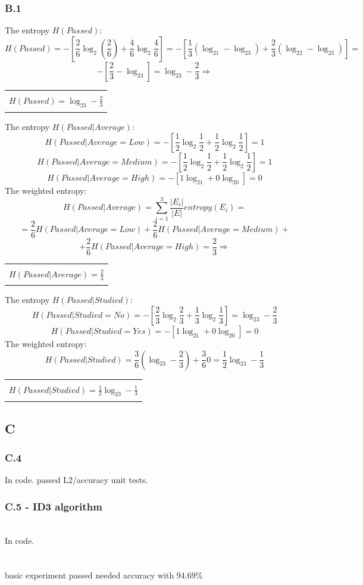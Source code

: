 \documentclass[12pt]{article}
\newcommand{\rectres}[1]{
\begin{center}
\begin{tabular}{ |c| }
\hline\\
#1\\
\\
\hline
\end{tabular}
\end{center}
}
\begin{document}
\subsubsection*{B.1}
The entropy $H(Passed)$:
$$H(Passed)= -[\frac{2}{6}\log_2(\frac{2}{6}) + \frac{4}{6}\log_2\frac{4}{6}] = -[\frac{1}{3}(\log_21- \log_23) + \frac{2}{3}(\log_22 - \log_23)]=$$ 
$$-[\frac{2}{3} - \log_23] = \log_23 - \frac{2}{3} \Rightarrow$$
\rectres{$H(Passed)=\log_23 - \frac{2}{3}$}
The entropy $H(Passed|Average)$:
$$H(Passed|Average=Low)= -[\frac{1}{2}\log_2\frac{1}{2} +\frac{1}{2}\log_2\frac{1}{2}] = 1$$ 
$$H(Passed|Average=Medium)= -[\frac{1}{2}\log_2\frac{1}{2} +\frac{1}{2}\log_2\frac{1}{2}] = 1$$ 
$$H(Passed|Average=High)= -[1\log_21 + 0\log_20] = 0$$ 
The weighted entropy:
$$H(Passed|Average)=\sum_{i=1}^3\frac{|E_i|}{|E|}entropy(E_i)=$$ $$=\frac{2}{6}H(Passed|Average=Low) + \frac{2}{6}H(Passed|Average=Medium)+$$
$$+\frac{2}{6}H(Passed|Average=High)=\frac{2}{3}\Rightarrow$$
\rectres{$H(Passed|Average)=\frac{2}{3}$}
The entropy $H(Passed|Studied)$:
$$H(Passed|Studied=No)= -[\frac{2}{3}\log_2\frac{2}{3} +\frac{1}{3}\log_2\frac{1}{3}] = \log_23 - \frac{2}{3}$$ 
$$H(Passed|Studied=Yes)= -[1\log_21 + 0\log_20] = 0$$ 
The weighted entropy:
$$H(Passed|Studied)=\frac{3}{6}(\log_23 - \frac{2}{3}) + \frac{3}{6}0= \frac{1}{2}\log_23 - \frac{1}{3}$$ 
\rectres{$H(Passed|Studied)=\frac{1}{2}\log_23 - \frac{1}{3}$}

\subsection*{C}
\subsubsection*{C.4}
In code. passed L2/accuracy unit tests.
\subsubsection*{C.5 - ID3 algorithm}
\\
In code.\\
\\
\\
basic experiment passed needed accuracy with 94.69\%
\end{document}
